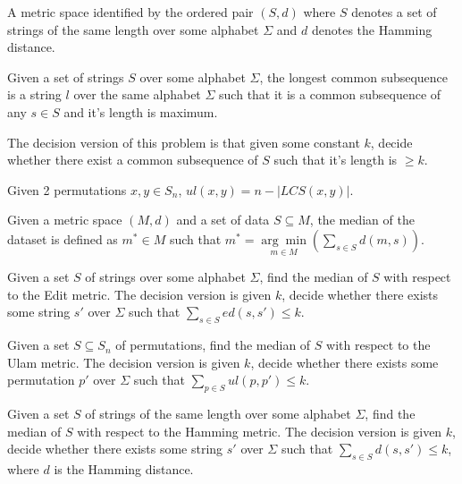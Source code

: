 \begin{definition}
    A metric space identified by the ordered pair $(S, d)$ where $S$ denotes a set of strings of the same length over some alphabet $\Sigma$ and $d$ denotes the Hamming distance.
\end{definition}

\begin{definition}
    Given a set of strings $S$ over some alphabet $\Sigma$, the longest common subsequence is a string $l$ over the same alphabet $\Sigma$ such that it is a common subsequence of any $s \in S$ and it's length is maximum. 
    
    The decision version of this problem is that given some constant $k$, decide whether there exist a common subsequence of $S$ such that it's length is $\geq k$.
\end{definition}

\begin{theorem}
\label{LCSFormula}
    Given 2 permutations $x, y \in S_n$, $ul(x, y) = n - |LCS(x, y)|$.
\end{theorem}

\begin{definition}
\label{Median String}
   Given a metric space $(M, d)$ and a set of data $S \subseteq M$, the median of the dataset is defined as $m^* \in M$ such that $m^* = \underset{m \in M}{\arg \min} \left(\sum\limits_{s \in S} d(m, s)\right)$.
\end{definition}

\begin{definition}
\label{Edit Median}
    Given a set $S$ of strings over some alphabet $\Sigma$, find the median of $S$ with respect to the Edit metric. The decision version is given $k$, decide whether there exists some string $s'$ over $\Sigma$ such that $\sum\limits_{s \in S} ed(s, s') \leq k$.
\end{definition}

\begin{definition}
\label{Ulam Median}
    Given a set $S \subseteq S_n$ of permutations, find the median of $S$ with respect to the Ulam metric. The decision version is given $k$, decide whether there exists some permutation $p'$ over $\Sigma$ such that $\sum\limits_{p \in S} ul(p, p') \leq k$.
\end{definition}

\begin{definition}
\label{HammingMedian}
    Given a set $S$ of strings of the same length over some alphabet $\Sigma$, find the median of $S$ with respect to the Hamming metric. The decision version is given $k$, decide whether there exists some string $s'$ over $\Sigma$ such that $\sum\limits_{s \in S} d(s, s') \leq k$, where $d$ is the Hamming distance.
\end{definition}

